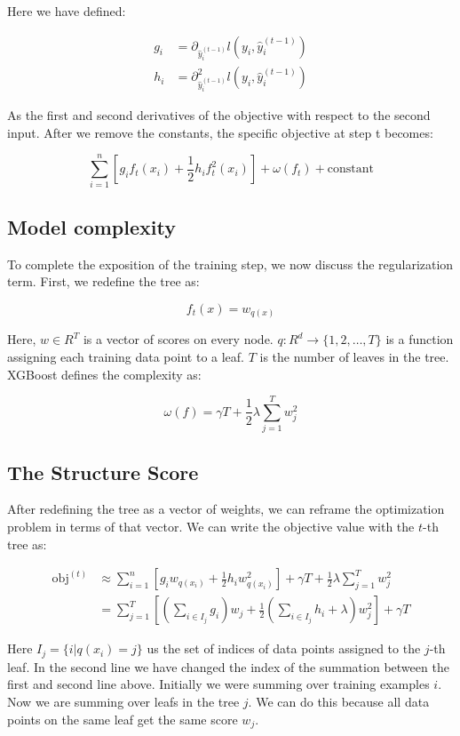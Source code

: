 \documentclass[12 pt, leqno]{article}
\begin{document}
Here we have defined:

\begin{align*}
g_i &= \partial_{\hat{y}_i^{(t - 1)}} l(y_i, \hat{y}_i^{(t - 1)}) \\ 
h_i &= \partial^2_{\hat{y}_i^{(t - 1)}} l(y_i, \hat{y}_i^{(t - 1)})
\end{align*}

As the first and second derivatives of the objective with respect to the second input. After we remove the constants, the specific objective at step t becomes:

$$ \sum_{i = 1}^n [g_i f_t (x_i) + \frac{1}{2} h_i f_t^2 (x_i) ] + \omega(f_t) + \text{constant} $$

\subsection{Model complexity}

To complete the exposition of the training step, we now discuss the regularization term. First, we redefine the tree as:

$$f_t(x) = w_{q(x)} $$

Here, $w \in R^T$ is a vector of scores on every node. $q: R^d \rightarrow \{1, 2, \dots, T \}$ is a function assigning each training data point to a leaf. $T$ is the number of leaves in the tree. XGBoost defines the complexity as:

$$\omega(f) = \gamma T + \frac{1}{2} \lambda \sum_{j = 1}^T w_j^2 $$

\subsection{The Structure Score}

After redefining the tree as a vector of weights, we can reframe the optimization problem in terms of that vector. We can write the objective value with the $t$-th tree as:

\begin{align*}
\text{obj}^{(t)} &\approx \sum_{i = 1}^n [g_i w_{q(x_i)} + \frac{1}{2} h_i w^2_{q(x_i)} ] + \gamma T + \frac{1}{2} \lambda \sum_{j =1}^T w_j^2 \\
&= \sum_{j = 1}^T [(\sum_{i \in I_j} g_i) w_j + \frac{1}{2} (\sum_{i \in I_j} h_i + \lambda) w_j^2 ]  + \gamma T
\end{align*}

Here $I_j = \{i | q(x_i) = j \} $ us the set of indices of data points assigned to the $j$-th leaf. In the second line we have changed the index of the summation between the first and second line above. Initially we were summing over training examples $i$. Now we are summing over leafs in the tree $j$. We can do this because all data points on the same leaf get the same score $w_j$.
\end{document}
